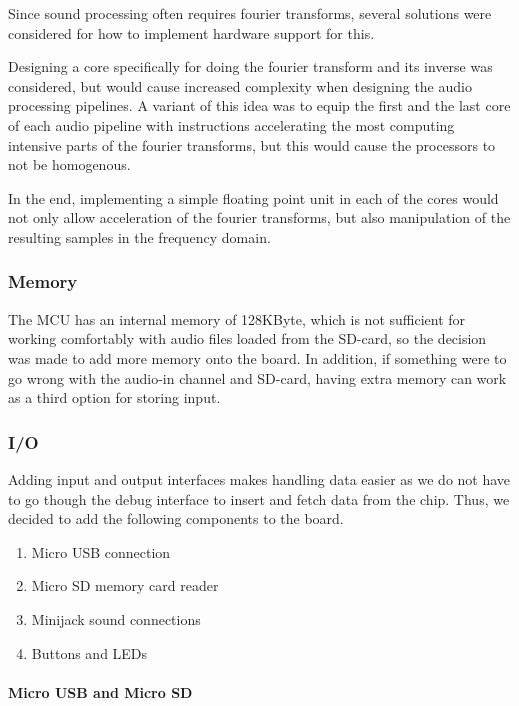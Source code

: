 Since sound processing often requires fourier transforms, several solutions were
considered for how to implement hardware support for this.

Designing a core specifically for doing the fourier transform and its inverse
was considered, but would cause increased complexity when designing the audio
processing pipelines. A variant of this idea was to equip the first and the last
core of each audio pipeline with instructions accelerating the most computing
intensive parts of the fourier transforms, but this would cause the processors
to not be homogenous.

In the end, implementing a simple floating point unit in each of the cores
would not only allow acceleration of the fourier transforms, but also
manipulation of the resulting samples in the frequency domain.

\subsubsection{Memory}

The MCU has an internal memory of 128KByte, which is not sufficient for working
comfortably with audio files loaded from the SD-card, so the decision was made
to add more memory onto the board. In addition, if something were to go wrong
with the audio-in channel and SD-card, having extra memory can work as a third
option for storing input.

\subsubsection{I/O}

Adding input and output interfaces makes handling data easier as we do not have
to go though the debug interface to insert and fetch data from the chip. Thus,
we decided to add the following components to the board.

\begin{enumerate}
	\item Micro USB connection
	\item Micro SD memory card reader
	\item Minijack sound connections
	\item Buttons and LEDs
\end{enumerate}

\paragraph{Micro USB and Micro SD}

